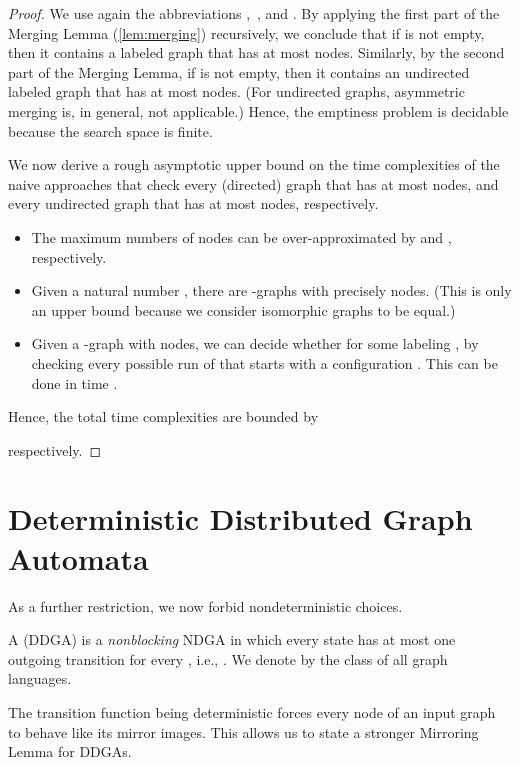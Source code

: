 \documentclass[a4paper,11pt,twoside]{report} \pdfoutput=1
\begin{document}
\begin{proof}
  We use again the abbreviations ,\, , and
  . By applying the first part of the Merging Lemma
  (\cref{lem:merging}) recursively, we conclude that if  is
  not empty, then it contains a labeled graph that has at most
   nodes. Similarly, by the second part of the Merging Lemma,
  if  is not empty, then it contains an undirected
  labeled graph that has at most  nodes. (For
  undirected graphs, asymmetric merging is, in general, not
  applicable.) Hence, the emptiness problem is decidable because the
  search space is finite.

  We now derive a rough asymptotic upper bound on the time
  complexities of the naive approaches that check every (directed)
  graph that has at most  nodes, and every undirected graph
  that has at most  nodes, respectively.
  \begin{itemize}
  \item The maximum numbers of nodes can be over-approximated by
     and , respectively.
  \item Given a natural number , there are 
    -graphs with precisely  nodes. (This is only an upper bound
    because we consider isomorphic graphs to be equal.)
  \item Given a -graph  with  nodes, we can decide whether
     for some labeling , by checking every
    possible run of  that starts with a configuration
    . This can be done in time
    .
  \end{itemize}
  Hence, the total time complexities are bounded by
  
  respectively.
\end{proof}

\section{Deterministic Distributed Graph Automata}
As a further restriction, we now forbid nondeterministic choices.

\begin{definition}
  A  (DDGA) is a
  \emph{nonblocking} NDGA  in which every
  state  has at most one outgoing transition for every
  \!, i.e., . We denote by
   the class of all  graph
  languages.
\end{definition}

The transition function being deterministic forces every node of an
input graph to behave like its mirror images. This allows us to state
a stronger Mirroring Lemma for DDGAs.
\end{document}
